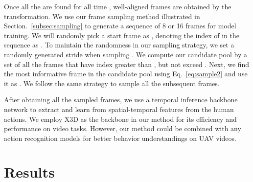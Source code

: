 \documentclass[10pt,twocolumn,letterpaper]{article}
\begin{document}
{Once all the  are found for all time ,  well-aligned frames are obtained by the transformation. We use our frame sampling method illustrated in Section.~\ref{subsec:sampling} to generate a sequence of 8 or 16 frames for model training. We will randomly pick a start frame as , denoting the index of  in the sequence as . To maintain the randomness in our sampling strategy, we set a randomly generated stride  when sampling . We compute our candidate pool  by a set of all the frames that have index greater than , but not exceed . Next, we find the most informative frame in the candidate pool using Eq.~\ref{eq:sample2} and use it as . We follow the same strategy to sample all the subsequent frames.

After obtaining all the sampled frames, we use a temporal inference backbone network to extract and learn from spatial-temporal features from the human actions. We employ X3D\cite{feichtenhofer2020x3d} as the backbone in our method for its efficiency and performance on video tasks. However, our method could be combined with any action recognition models for better behavior understandings on UAV videos.


\label{sec:method}

 \section{Results}
\label{sec:results}

\begin{table}
\centering
{}
\vspace{-7pt}
\caption{Results on Drone Action. Our method achieves 100\% top-1 accuracy, 16.6\% over the baseline method X3D-M\cite{feichtenhofer2020x3d}, outperforming current state-of-the-art method FAR\cite{divya2022far} by 7.3\% under same configuration. (HLPF \cite{jhuang2013towards}, PCNN \cite{cheron2015p})}
\vspace{-5pt}
\label{tab:droneaction}
\end{table}

}
\end{document}

